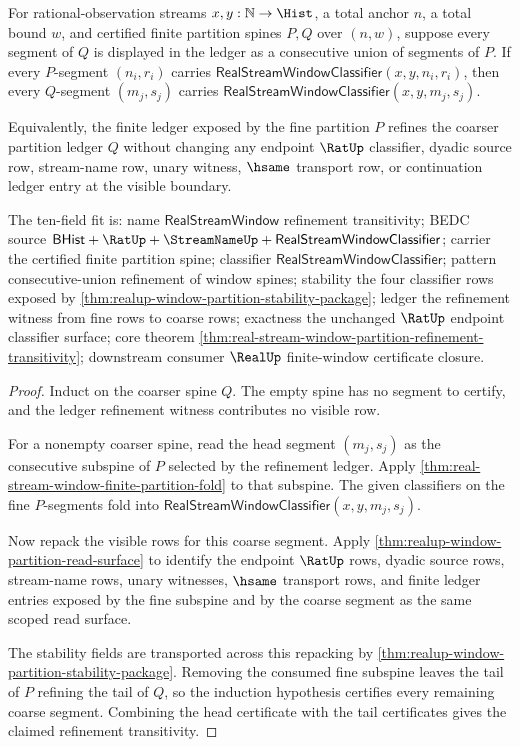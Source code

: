 \begin{theorem}
\label{thm:real-stream-window-partition-refinement-transitivity}
For rational-observation streams $x,y:\mathbb{N}\to\Hist$, a total anchor $n$,
a total bound $w$, and certified finite partition spines $P,Q$ over $(n,w)$,
suppose every segment of $Q$ is displayed in the ledger as a consecutive union
of segments of $P$. If every $P$-segment $(n_i,r_i)$ carries
$\mathsf{RealStreamWindowClassifier}(x,y,n_i,r_i)$, then every $Q$-segment
$(m_j,s_j)$ carries $\mathsf{RealStreamWindowClassifier}(x,y,m_j,s_j)$.

Equivalently, the finite ledger exposed by the fine partition $P$ refines the
coarser partition ledger $Q$ without changing any endpoint $\RatUp$
classifier, dyadic source row, stream-name row, unary witness, $\hsame$
transport row, or continuation ledger entry at the visible boundary.

The ten-field fit is: name $\mathsf{RealStreamWindow}$ refinement
transitivity; BEDC source
$\mathsf{BHist}+\RatUp+\StreamNameUp+\mathsf{RealStreamWindowClassifier}$;
carrier the certified finite partition spine; classifier
$\mathsf{RealStreamWindowClassifier}$; pattern consecutive-union refinement of
window spines; stability the four classifier rows exposed by
\autoref{thm:realup-window-partition-stability-package}; ledger the refinement
witness from fine rows to coarse rows; exactness the unchanged $\RatUp$
endpoint classifier surface; core theorem
\autoref{thm:real-stream-window-partition-refinement-transitivity}; downstream
consumer $\RealUp$ finite-window certificate closure.
\end{theorem}
\begin{proof}
Induct on the coarser spine $Q$. The empty spine has no segment to certify, and
the ledger refinement witness contributes no visible row.

For a nonempty coarser spine, read the head segment $(m_j,s_j)$ as the
consecutive subspine of $P$ selected by the refinement ledger. Apply
\autoref{thm:real-stream-window-finite-partition-fold} to that subspine. The
given classifiers on the fine $P$-segments fold into
$\mathsf{RealStreamWindowClassifier}(x,y,m_j,s_j)$.

Now repack the visible rows for this coarse segment. Apply
\autoref{thm:realup-window-partition-read-surface} to identify the endpoint
$\RatUp$ rows, dyadic source rows, stream-name rows, unary witnesses, $\hsame$
transport rows, and finite ledger entries exposed by the fine subspine and by
the coarse segment as the same scoped read surface.

The stability fields are transported across this repacking by
\autoref{thm:realup-window-partition-stability-package}. Removing the consumed
fine subspine leaves the tail of $P$ refining the tail of $Q$, so the induction
hypothesis certifies every remaining coarse segment. Combining the head
certificate with the tail certificates gives the claimed refinement
transitivity.
\end{proof}

